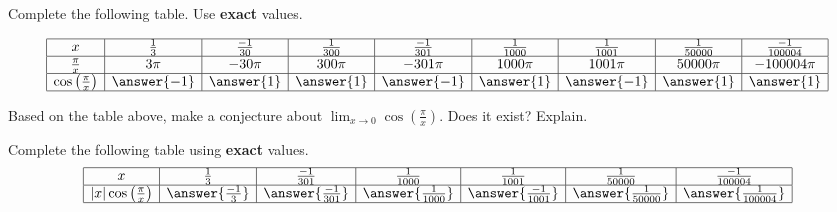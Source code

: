 \documentclass{ximera}
\author{Nela Lakos \and Kyle Parsons \and Bobby Ramsey}
\begin{document}
\begin{exercise}

Complete the following table.  Use \textbf{exact} values.

\[
\begin{array}{|c|c|c|c|c|c|c|c|c|}
\hline
x & \frac{1}{3} & \frac{-1}{30} & \frac{1}{300} & \frac{-1}{301} & \frac{1}{1000} & \frac{1}{1001} & \frac{1}{50000} & \frac{-1}{100004}\\\hline
\frac{\pi}{x} & 3\pi & -30\pi & 300\pi & -301\pi & 1000\pi & 1001\pi & 50000\pi & -100004\pi \\\hline
\cos\left(\frac{\pi}{x}\right) & \answer{-1} & \answer{1} & \answer{1} & \answer{-1} & \answer{1} & \answer{-1} & \answer{1} & \answer{1} \\\hline
\end{array}
\]

\begin{question}
Based on the table above, make a conjecture about $\lim_{x\to0}\cos\left(\frac{\pi}{x}\right)$.  Does it exist? Explain.
\begin{multipleChoice}
\end{multipleChoice}
\end{question}




\begin{exercise}
Complete the following table using \textbf{exact} values.
\[
\begin{array}{|c|c|c|c|c|c|c|}
\hline
x & \frac{1}{3} & \frac{-1}{301} & \frac{1}{1000} & \frac{1}{1001} & \frac{1}{50000} & \frac{-1}{100004}\\\hline
\left|x\right|\cos\left(\frac{\pi}{x}\right) & \answer{\frac{-1}{3}} & \answer{\frac{-1}{301}} & \answer{\frac{1}{1000}} & \answer{\frac{-1}{1001}} & \answer{\frac{1}{50000}} & \answer{\frac{1}{100004}}\\\hline
\end{array}
\]


\end{exercise}
\end{exercise}
\end{document}

